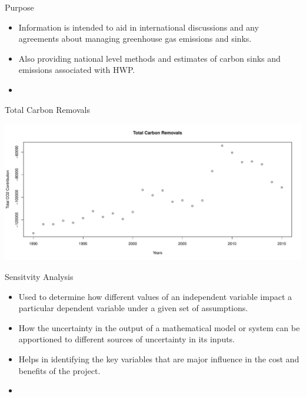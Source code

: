 \documentclass[final]{beamer}\usepackage[]{graphicx}\usepackage[]{color}
\makeatletter
\def\maxwidth{ %
  \ifdim\Gin@nat@width>\linewidth
    \linewidth
  \else
    \Gin@nat@width
  \fi
}
\newenvironment{knitrout}{}{} %
\makeatother
\begin{document}
\begin{frame}[fragile]
\begin{columns}[t]
\begin{column}{0.23\linewidth}
\begin{minipage}[t][.955\textheight]{\linewidth} 

\begin{block}{Purpose}
\vspace{0ex}
\begin{itemize}
\item Information is intended to aid in international discussions and any agreements about managing greenhouse gas emissions and sinks.
\item Also providing national level methods and estimates of carbon sinks and emissions associated with HWP.
\item
\end{itemize}
\vspace{-1.5ex}
\end{block}
\vfill

\begin{block}{Total Carbon Removals}
\vspace{0ex}
\begin{knitrout}
\color{fgcolor}

{\centering \includegraphics[width=\maxwidth]{figure/RCODE-1} 

}



\end{knitrout}
\vspace{-1.5ex}
\end{block}
\vfill

\vspace{0ex}
\begin{block}{Sensitvity Analysis}
\begin{itemize}
\item Used to determine how different values of an independent variable impact a particular dependent variable under a given set of assumptions. 
\item How the uncertainty in the output of a mathematical model or system can be apportioned to different sources of uncertainty in its inputs.
\item Helps in identifying the key variables that are major influence in the cost and benefits of the project.
\item 
\end{itemize}
\vspace{0ex}
\end{block}
\vfill


\end{minipage}
\end{column}
\end{columns}
\end{frame}
\end{document}
